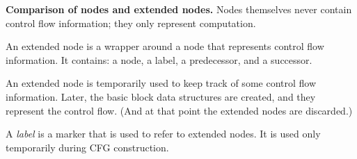 \textbf{Comparison of nodes and extended nodes.}
Nodes themselves never contain control flow information; they only
represent computation.

An extended node is a wrapper around a node that represents control flow
information.  It contains:  a node, a label, a predecessor, and a
successor.

An extended node is temporarily used to keep track of some control flow
information.  Later, the basic block data structures are created, and they
represent the control flow.  (And at that point the extended nodes are
discarded.)
\begin{definition}[Label]
    A \emph{label} is a marker that is used to refer to extended
    nodes. It is used only temporarily during CFG construction.
\end{definition}




